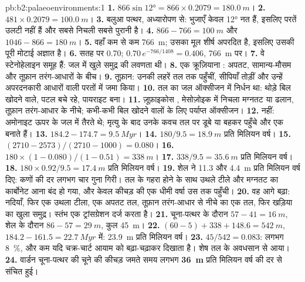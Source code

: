 \begin{solution}{pb:b2:palaeoenvironments:1}
\textbf{1.} $866 \sin \ang{12} = 866 \times 0.2079 = \qty{180.0}{m}$।
\textbf{2.} $481 \times 0.2079 = \qty{100.0}{m}$।
\textbf{3.} बलुआ पत्थर, अध्यारोपण से: भुजाएँ केवल \ang{12} नत हैं, इसलिए परतें
उलटी नहीं हैं और सबसे निचली सबसे पुरानी है।
\textbf{4.} $866 - 766 = \qty{100}{m}$ और $1046 - 866 = \qty{180}{m}$।
\textbf{5.} वहाँ कम से कम \qty{766}{m}; उसका मूल शीर्ष अपरदित है, इसलिए उसकी पूरी मोटाई
अज्ञात है।
\textbf{6.} सतह पर 0.70; $0.70\,e^{-766/1408} = 0.406$, \qty{766}{m} पर।
\textbf{7.} वे स्टेनोहेलाइन समूह हैं: जल में खुले समुद्र की लवणता थी।
\textbf{8.} एक क्रूज़ियाना : अपतट, सामान्य-मौसम और तूफ़ान तरंग-आधारों
के बीच।
\textbf{9.} तूफ़ान: उनकी लहरें तल तक पहुँचीं, सीपियाँ तोड़ीं और उन्हें अपरदनकारी आधारों वाली
परतों में जमा किया।
\textbf{10.} तल का जल ऑक्सीजन में निर्धन था: थोड़े बिल खोदने वाले, पटल बचे रहे, पायराइट बना।
\textbf{11.} ज़ूफ़ाइकोस , मेसोज़ोइक में निचला मग्नतट या ढलान, तूफ़ान तरंग-आधार
के नीचे; कभी-कभी बिल खोदने वालों के लिए पर्याप्त ऑक्सीजन।
\textbf{12.} नहीं: अमोनाइट ऊपर के जल में तैरते थे; मृत्यु के बाद उनके कवच तल पर डूबे या बहकर
पहुँचे और एक  बनाते हैं।
\textbf{13.} $184.2 - 174.7 = \qty{9.5}{Myr}$।
\textbf{14.} $180/9.5 = \qty{18.9}{m}$ प्रति मिलियन वर्ष।
\textbf{15.} $(2710 - 2573)/(2710 - 1000) = 0.080$।
\textbf{16.} $180 \times (1 - 0.080)/(1 - 0.51) = \qty{338}{m}$।
\textbf{17.} $338/9.5 = \qty{35.6}{m}$ प्रति मिलियन वर्ष।
\textbf{18.} $180 \times 0.92/9.5 = \qty{17.4}{m}$ प्रति मिलियन वर्ष।
\textbf{19.} शेल ने 11.3 और \qty{4.4}{m} प्रति मिलियन वर्ष दिए: कणों की दर
लगभग चार गुना गिरी। तल के गहरा होने के साथ उथले टीले और मग्नतट का कार्बोनेट आना बंद हो गया,
और केवल कीचड़ की एक धीमी वर्षा उस तक पहुँची।
\textbf{20.} वह आगे बढ़ा: नदियाँ, फिर एक उथला टीला, एक अपतट तल, तूफ़ान तरंग-आधार से नीचे का
एक तल, फिर खड़िया का खुला समुद्र। स्तंभ एक ट्रांसग्रेशन दर्ज करता है।
\textbf{21.} चूना-पत्थर के दौरान $57 - 41 = \qty{16}{m}$, शेल के दौरान $86 - 57 = \qty{29}{m}$,
कुल \qty{45}{m}।
\textbf{22.} $(60 - 5) + 338 + 148.6 = \qty{542}{m}$, $184.2 - 161.5 = \qty{22.7}{Myr}$ में:
\qty{23.9}{m} प्रति मिलियन वर्ष।
\textbf{23.} $45/542 = 0.083$: लगभग \qty{8}{\percent}, और कम यदि चक्र-चार्ट
आयाम को बढ़ा-चढ़ाकर दिखाता है। शेष तल के अवधसान से आया।
\textbf{24.} वार्डन चूना-पत्थर की चूने की कीचड़ जमते समय लगभग
\textbf{\qty[text-series-to-math=true]{36}{m}} प्रति मिलियन वर्ष की दर से संचित हुई।
\end{solution}
